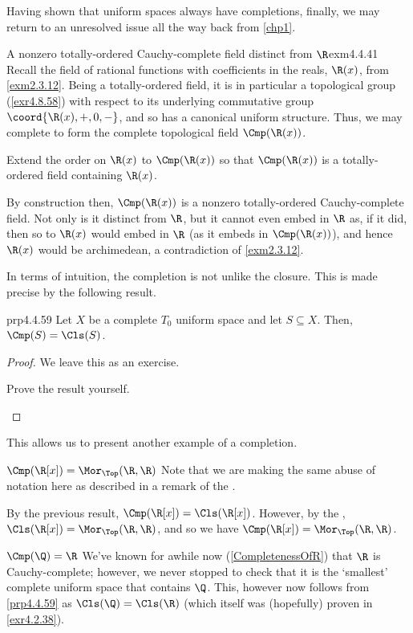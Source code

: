 Having shown that uniform spaces always have completions, finally, we may return to an unresolved issue all the way back from \cref{chp1}.
\begin{exm}{A nonzero totally-ordered Cau\-chy-complete field distinct from $\R$}{exm4.4.41}
Recall the field of rational functions with coefficients in the reals, $\R (x)$, from \cref{exm2.3.12}.  Being a totally-ordered field, it is in particular a topological group (\cref{exr4.8.58}) with respect to its underlying commutative group $\coord{\R (x),+,0,-}$, and so has a canonical uniform structure.  Thus, we may complete to form the complete topological field $\Cmp (\R (x))$.
\begin{exr}[breakable=false]{}{}
Extend the order on $\R (x)$ to $\Cmp (\R (x))$ so that $\Cmp (\R (x))$ is a totally-ordered field containing $\R (x)$.
\end{exr}
By construction then, $\Cmp (\R (x))$ is a nonzero totally-ordered Cauchy-complete field.  Not only is it distinct from $\R$, but it cannot even embed in $\R$ as, if it did, then so to $\R (x)$ would embed in $\R$ (as it embeds in $\Cmp (\R (x))$), and hence $\R (x)$ would be archimedean, a contradiction of \cref{exm2.3.12}.
\end{exm}

In terms of intuition, the completion is not unlike the closure.  This is made precise by the following result.
\begin{prp}{}{prp4.4.59}
Let $X$ be a complete $T_0$ uniform space and let $S\subseteq X$.  Then, $\Cmp (S)=\Cls (S)$.
\begin{proof}
We leave this as an exercise.
\begin{exr}{}{}
Prove the result yourself.
\end{exr}
\end{proof}
\end{prp}
This allows us to present another example of a completion.
\begin{exm}{$\Cmp (\R [x])=\Mor _{\Top}(\R ,\R )$}{}
Note that we are making the same abuse of notation here as described in a remark of the .

By the previous result, $\Cmp (\R [x])=\Cls (\R [x])$.  However, by the , $\Cls (\R [x])=\Mor _{\Top}(\R ,\R )$, and so we have $\Cmp (\R [x])=\Mor _{\Top}(\R ,\R )$.
\end{exm}
\begin{exm}{$\Cmp (\Q )=\R$}{}
We've known for awhile now (\cref{CompletenessOfR}) that $\R$ is Cauchy-complete; however, we never stopped to check that it is the `smallest' complete uniform space that contains $\Q$.  This, however now follows from \cref{prp4.4.59} as $\Cls (\Q )=\Cls (\R )$ (which itself was (hopefully) proven in \cref{exr4.2.38}).
\end{exm}

